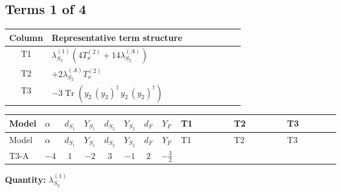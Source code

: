 \documentclass[8pt]{article}
\begin{document}
\begin{landscape}
\subsection*{Terms 1 of 4}
\begin{center}
\begin{tabular}{@{}c >{\raggedright\arraybackslash}p{0.82\linewidth}@{}}
\toprule
Column & Representative term structure \\
\midrule
T1 & \(\displaystyle {\lambda_{S_2}^{(1)}} (4 T_{\nu}^{(2)}+14 {\lambda_{S_2}^{(A)}})\) \\
\midrule
T2 & \(\displaystyle +2 {\lambda_{S_2}^{(A)}} T_{\nu}^{(2)}\) \\
\midrule
T3 & \(\displaystyle -3 \operatorname{Tr}\!\left({y_2}\,\left({y_2}\right)^{\dagger}\,{y_2}\,\left({y_2}\right)^{\dagger}\right)\) \\
\midrule
\bottomrule
\end{tabular}
\end{center}
\smallskip
\tiny
\begin{longtable}{@{}llcccccc >{\raggedright\arraybackslash}p{0.21\linewidth} >{\raggedright\arraybackslash}p{0.21\linewidth} >{\raggedright\arraybackslash}p{0.21\linewidth}@{}}
\toprule
Model & $\alpha$ & $d_{S_1}$ & $Y_{S_1}$ & $d_{S_2}$ & $Y_{S_2}$ & $d_F$ & $Y_F$ & T1 & T2 & T3 \\
\midrule
\endfirsthead
\toprule
Model & $\alpha$ & $d_{S_1}$ & $Y_{S_1}$ & $d_{S_2}$ & $Y_{S_2}$ & $d_F$ & $Y_F$ & T1 & T2 & T3 \\
\midrule
\endhead
T3-A & $-4$ & $1$ & $-2$ & $3$ & $-1$ & $2$ & $-\frac{3}{2}$ & \scriptsize\adjustbox{max width=\linewidth}{$\begin{gathered} {\lambda_{S_2}^{(1)}} (4 T_{\nu}^{(2)}+14 {\lambda_{S_2}^{(A)}})\end{gathered}$} & \scriptsize\adjustbox{max width=\linewidth}{$\begin{gathered} +2 {\lambda_{S_2}^{(A)}} T_{\nu}^{(2)}\end{gathered}$} & \scriptsize\adjustbox{max width=\linewidth}{$\begin{gathered} -3 \operatorname{Tr}\!\left({y_2}\,\left({y_2}\right)^{\dagger}\,{y_2}\,\left({y_2}\right)^{\dagger}\right)\end{gathered}$} \\
\midrule
\bottomrule
\end{longtable}
\clearpage
\noindent\textbf{Quantity: }$\lambda_{S_2}^{(1)}$\par\smallskip

\end{landscape}
\end{document}
